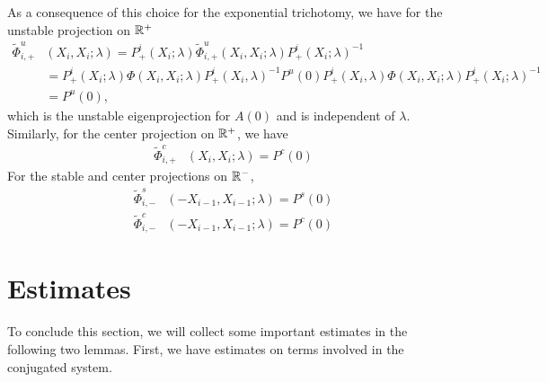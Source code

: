\documentclass[thesis.tex]{subfiles}
\begin{document}
As a consequence of this choice for the exponential trichotomy, we have for the unstable projection on $\mathbb{R}^+$
\begin{align*}
\tilde{\Phi}_{i,+}^{u}&(X_i, X_i ; \lambda) = P^i_+(X_i; \lambda) \tilde{\Phi}_{i,+}^{u}(X_i, X_i; \lambda) P^i_+(X_i; \lambda)^{-1} \\
&= P^i_+(X_i; \lambda) \Phi(X_i, X_i; \lambda) P^i_+(X_i, \lambda)^{-1}
P^u(0) P^i_+(X_i, \lambda) \Phi(X_i, X_i; \lambda) P^i_+(X_i; \lambda)^{-1} \\
&= P^u(0),
\end{align*}
which is the unstable eigenprojection for $A(0)$ and is independent of $\lambda$. Similarly, for the center projection on $\mathbb{R}^+$, we have
\begin{align*}
\tilde{\Phi}_{i,+}^{c}&(X_i, X_i ; \lambda) = P^c(0)
\end{align*}
For the stable and center projections on $\mathbb{R}^-$,
\begin{align*}
\tilde{\Phi}_{i,-}^{s}&(-X_{i-1}, X_{i-1} ; \lambda) = P^s(0) \\
\tilde{\Phi}_{i,-}^{c}&(-X_{i-1}, X_{i-1} ; \lambda) = P^c(0)
\end{align*}

\section{Estimates}

To conclude this section, we will collect some important estimates in the following two lemmas. First, we have estimates on terms involved in the conjugated system.
\end{document}
